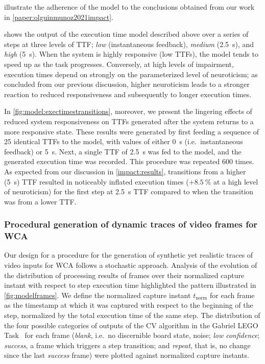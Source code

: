  illustrate the adherence of the model to the conclusions obtained from our work in \cref{paper:olguinmunoz2021impact}.

 shows the output of the execution time model described above over a series of steps at three levels of \gls{TTF};
\emph{low} (instantaneous feedback), \emph{medium} (\SI{2.5}{\second}), and \emph{high} (\SI{5}{\second}).
When the system is highly responsive (low \glspl{TTF}), the model tends to speed up as the task progresses.
Conversely, at high levels of impairment, execution times depend on strongly on the parameterized level of neuroticism;
as concluded from our previous discussion, higher neuroticism leads to a stronger reaction to reduced responsiveness and subsequently to longer execution times.

In \cref{fig:model:exectimestransitions}, moreover, we present the lingering effects of reduced system responsiveness on \glspl{TTF} generated after the system returns to a more responsive state.
These results were generated by first feeding a sequence of \num{25} identical \glspl{TTF} to the model, with values of either \SI{0}{\second} (i.e.\ instantaneous feedback) or \SI{5}{\second}.
Next, a single \gls{TTF} of \SI{2.5}{\second} was fed to the model, and the generated execution time was recorded.
This procedure was repeated \num{600} times.
As expected from our discussion in \cref{impact:results}, transitions from a higher (\SI{5}{\second}) \gls{TTF} resulted in noticeably inflated execution times (\ensuremath{+\SI{8.5}{\percent}} at a high level of neuroticism) for the first step at \SI{2.5}{\second} \gls{TTF} compared to when the transition was from a lower \gls{TTF}.

\subsubsection{Procedural generation of dynamic traces of video frames for \acs{WCA}}\label{model:traces}

Our design for a procedure for the generation of synthetic yet realistic traces of video inputs for \gls{WCA} follows a stochastic approach.
Analysis of the evolution of the distribution of processing results of frames over their normalized capture instant with respect to step execution time highlighted the pattern illustrated in \cref{fig:modelframes}.
We define the normalized capture instant \ensuremath{t_\text{norm}} for each frame as the timestamp at which it was captured with respect to the beginning of the step, normalized by the total execution time of the same step.
The distribution of the four possible categories of outputs of the \gls{CV} algorithm in the Gabriel LEGO Task~\cite{chen2018application} for each frame (\emph{blank}, i.e.\ no discernible board state, noise; \emph{low confidence}; \emph{success}, a frame which triggers a step transition;
and \emph{repeat}, that is, no change since the last \emph{success} frame) were plotted against normalized capture instants.


